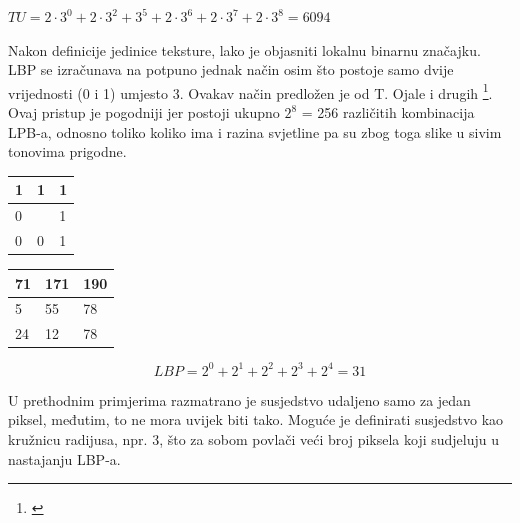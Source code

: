 \documentclass[times, utf8, zavrsni]{fer}
\begin{document}
\begin{center}
\(TU = 2 \cdot 3^0 + 2 \cdot 3^2 + 3^5 + 2 \cdot 3^6 + 2 \cdot 3^7 + 2 \cdot 3^8 = 6094\)
\end{center}

\medskip

Nakon definicije jedinice teksture, lako je objasniti lokalnu binarnu značajku. 
LBP se izračunava na potpuno jednak način osim što postoje samo dvije vrijednosti 
(0 i 1) umjesto 3. Ovakav način predložen je od T. Ojale i drugih \footnote{\cite{ojala}}. Ovaj 
pristup je pogodniji jer postoji ukupno \(2^8\)  = 256 različitih kombinacija LPB-a, 
odnosno toliko koliko ima i razina svjetline pa su zbog toga slike u sivim 
tonovima prigodne.


\begin{multicols}{2}

\begin{minipage}{\linewidth}
\centering
\begin{tabularx}{0.4\textwidth}{| X | X | X |}
\hline
1 & 1 & 1 \\ 
\hline
0 &  & 1 \\ 
\hline
0 & 0 & 1 \\
\hline
\end{tabularx}
\end{minipage}

\begin{minipage}{\linewidth}
\centering
\begin{tabularx}{0.4\textwidth}{| X | X | X |}
\hline
71 & 171 & 190 \\ 
\hline
5 & 55 & 78 \\ 
\hline
24 & 12 & 78 \\
\hline
\end{tabularx}
\end{minipage}

\end{multicols}

\[LBP = 2^0 + 2^1 + 2^2 + 2^3 + 2^4 = 31\]

\newpage

U prethodnim primjerima razmatrano je susjedstvo udaljeno samo za 
jedan piksel, međutim, to ne mora uvijek biti tako. Moguće je 
definirati susjedstvo kao kružnicu radijusa, npr. 3, što za sobom 
povlači veći broj piksela koji sudjeluju u nastajanju LBP-a. 

\bigbreak
\end{document}
